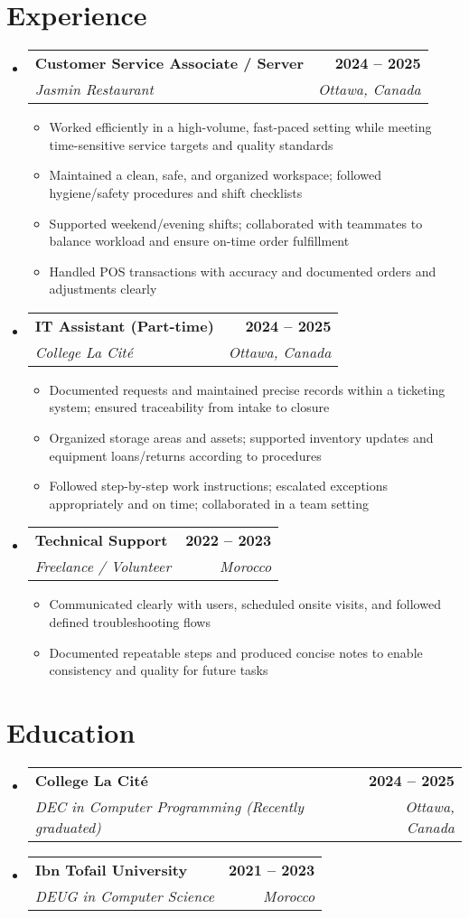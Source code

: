 \documentclass[letterpaper,11pt]{article}
\makeatletter
\newcommand{\resumeItem}[1]{
  \item\small{
    {#1 \vspace{0pt}}
  }
}
\newcommand{\resumeSubheading}[4]{
  \vspace{-2pt}\item
    \begin{tabular*}{1.0\textwidth}[t]{l@{\extracolsep{\fill}}r}
      \textbf{#1} & \textbf{\small #2} \\
      \textit{\small#3} & \textit{\small #4} \\
    \end{tabular*}\vspace{-7pt}
}
\newcommand{\resumeSubHeadingListStart}{\begin{itemize}[leftmargin=0.0in, label={}]}
\newcommand{\resumeSubHeadingListEnd}{\end{itemize}}\vspace{0pt}
\newcommand{\resumeItemListStart}{\begin{itemize}}
\newcommand{\resumeItemListEnd}{\end{itemize}\vspace{-5pt}}
\makeatother
\begin{document}
\section{Experience}
  \resumeSubHeadingListStart
    \resumeSubheading{Customer Service Associate / Server}{2024 -- 2025}{Jasmin Restaurant}{Ottawa, Canada}
      \resumeItemListStart
        \resumeItem{Worked efficiently in a high-volume, fast-paced setting while meeting time-sensitive service targets and quality standards}
        \resumeItem{Maintained a clean, safe, and organized workspace; followed hygiene/safety procedures and shift checklists}
        \resumeItem{Supported weekend/evening shifts; collaborated with teammates to balance workload and ensure on-time order fulfillment}
        \resumeItem{Handled POS transactions with accuracy and documented orders and adjustments clearly}
      \resumeItemListEnd

    \resumeSubheading{IT Assistant (Part-time)}{2024 -- 2025}{College La Cit\'e}{Ottawa, Canada}
      \resumeItemListStart
        \resumeItem{Documented requests and maintained precise records within a ticketing system; ensured traceability from intake to closure}
        \resumeItem{Organized storage areas and assets; supported inventory updates and equipment loans/returns according to procedures}
        \resumeItem{Followed step-by-step work instructions; escalated exceptions appropriately and on time; collaborated in a team setting}
      \resumeItemListEnd

    \resumeSubheading{Technical Support}{2022 -- 2023}{Freelance / Volunteer}{Morocco}
      \resumeItemListStart
        \resumeItem{Communicated clearly with users, scheduled onsite visits, and followed defined troubleshooting flows}
        \resumeItem{Documented repeatable steps and produced concise notes to enable consistency and quality for future tasks}
      \resumeItemListEnd

  \resumeSubHeadingListEnd
  \vspace{-12pt}

\section{Education}\vspace{1mm}
  \resumeSubHeadingListStart
    \resumeSubheading
      {College La Cit\'e}{2024 -- 2025}
      {DEC in Computer Programming (Recently graduated)}{Ottawa, Canada}
    \resumeSubheading
      {Ibn Tofail University}{2021 -- 2023}
      {DEUG in Computer Science}{Morocco}
  \resumeSubHeadingListEnd
  \vspace{-12pt}
\end{document}
